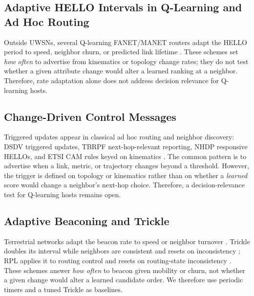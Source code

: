 \subsection{Adaptive HELLO Intervals in Q-Learning and Ad Hoc Routing}
Outside UWSNs, several Q-learning FANET/MANET routers adapt the HELLO
period to speed, neighbor churn, or predicted link lifetime
\cite{liu2020qmr,wei2023qfagr,cui2022tarraq,mahmud2019eehello,han2013hello}.
These schemes set \emph{how often} to advertise from kinematics or
topology change rates; they do not test whether a given attribute change
would alter a learned ranking at a neighbor.
Therefore, rate adaptation alone does not address decision relevance for
Q-learning hosts.

\subsection{Change-Driven Control Messages}
Triggered updates appear in classical ad hoc routing and neighbor
discovery: DSDV triggered updates, TBRPF next-hop-relevant reporting,
NHDP responsive HELLOs, and ETSI CAM rules keyed on kinematics
\cite{perkins1994dsdv,rfc3684,rfc6130,etsi302637}.
The common pattern is to advertise when a link, metric, or trajectory
changes beyond a threshold.
However, the trigger is defined on topology or kinematics rather than on
whether a \emph{learned} score would change a neighbor's next-hop choice.
Therefore, a decision-relevance test for Q-learning hosts remains open.

\subsection{Adaptive Beaconing and Trickle}
Terrestrial networks adapt the beacon rate to speed or neighbor turnover
\cite{ingelrest2007tap,sadiq2013beaconing}.
Trickle doubles its interval while neighbors are consistent and resets on
inconsistency \cite{levis2004trickle,rfc6206}; RPL applies it to routing
control and resets on routing-state inconsistency \cite{rfc6550}.
These schemes answer \emph{how often} to beacon given mobility or churn,
not whether a given change would alter a learned candidate order.
We therefore use periodic timers and a tuned Trickle as baselines.

